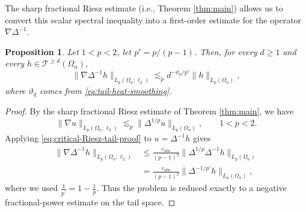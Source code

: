 \documentclass{amsart}
\numberwithin{equation}{section}
\newtheorem{prop}[thm]{Proposition}
\theoremstyle{definition}
\theoremstyle{remark}
\newcommand{\1}{\mathbf 1}
\begin{document}
The sharp fractional Riesz estimate (i.e., Theorem \ref{thm:main}) allows us to convert this scalar spectral inequality into a first-order estimate for the operator $\nabla\Delta^{-1}$.

\begin{prop}
\label{prop:tail-gradient-potential}
Let $1<p<2$, let $p'=p/(p-1)$.  Then, for every $d\ge1$ and every
$h\in \mathcal{T}^{\geq d}(\Omega_{n})$,
\begin{equation}\label{eq:tail-gradient-potential}
 \|\nabla\Delta^{-1}h\|_{L_p(\Omega_n;\ell_2)}
 \lesssim_p
 d^{-\vartheta_p/p'}
 \|h\|_{L_p(\Omega_n)},
\end{equation}
where $\vartheta_q$ comes from \eqref{eq:tail-heat-smoothing}.
\end{prop}

\begin{proof}
By the sharp fractional Riesz estimate of Theorem \ref{thm:main}, we have
\begin{equation}
 \|\nabla u\|_{L_p(\Omega_n;\ell_2)}
 \lesssim_p
 \|\Delta^{1/p}u\|_{L_p(\Omega_n)},
 \qquad 1<p<2.
 \label{eq:critical-Riesz-tail-proof}
\end{equation}
Applying \eqref{eq:critical-Riesz-tail-proof} to
$u=\Delta^{-1}h$ gives
\begin{equation}\label{eq:gradient-potential-factor}
\begin{split}
\|\nabla\Delta^{-1}h\|_{L_p(\Omega_n;\ell_2)}
 &\leq \frac{c_{\mathrm{abs}}}{(p-1)^{2}}\|\Delta^{1/p}\Delta^{-1}h\|_{L_p(\Omega_n)}\\
 &=\frac{c_{\mathrm{abs}}}{(p-1)^{2}}\|\Delta^{-1/p'}h\|_{L_p(\Omega_n)},
\end{split}
\end{equation}
where we used $\frac{1}{p^{\prime}}=1-\frac{1}{p}$. Thus the problem is reduced exactly to a negative fractional-power estimate on the tail space.


\end{proof}
\end{document}

